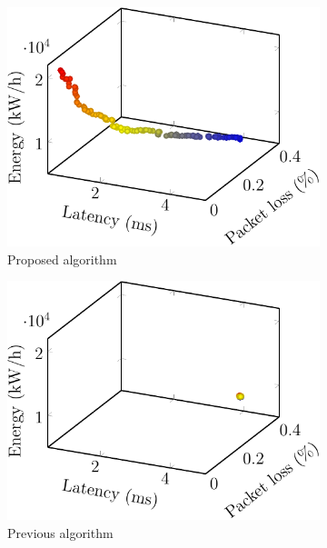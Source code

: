 \begin{figure}[t!]
    \centering
    \begin{subfigure}[b]{0.19\linewidth}
        \includegraphics[width=\textwidth]{graphs/comparison/qm-crop}
        \caption{Proposed algorithm}
    \end{subfigure}
    \begin{subfigure}[b]{0.19\linewidth}
        \includegraphics[width=\textwidth]{graphs/comparison/previous-crop}
        \caption{Previous algorithm}
    \end{subfigure}
    \begin{subfigure}[b]{0.19\linewidth}

\end{subfigure}
\end{figure}
